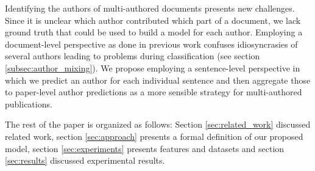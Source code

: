 Identifying the authors of multi-authored documents presents new challenges.
Since it is unclear which author contributed which part of a document, we lack ground truth that could be used to build a model for each author.
Employing a document-level perspective as done in previous work confuses idiosyncrasies of several authors leading to problems during classification (see section \ref{subsec:author_mixing}).
We propose employing a sentence-level perspective in which we predict an author for each individual sentence and then aggregate those to paper-level author predictions as a more sensible strategy for multi-authored publications. 

The rest of the paper is organized as follows: Section \ref{sec:related_work} discussed related work, section \ref{sec:approach} presents a formal definition of our proposed model, section \ref{sec:experiments} presents features and datasets and section \ref{sec:results} discussed experimental results. 
